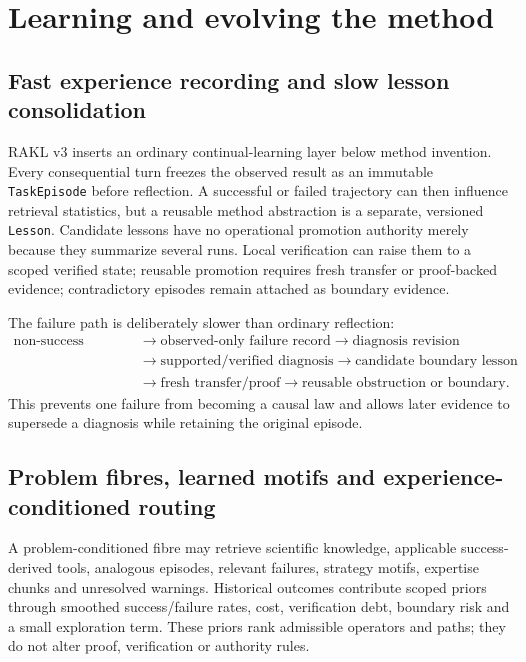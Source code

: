 \section{Learning and evolving the method}


\subsection{Fast experience recording and slow lesson consolidation}
RAKL v3 inserts an ordinary continual-learning layer below method invention. Every consequential turn freezes the observed result as an immutable \texttt{TaskEpisode} before reflection. A successful or failed trajectory can then influence retrieval statistics, but a reusable method abstraction is a separate, versioned \texttt{Lesson}. Candidate lessons have no operational promotion authority merely because they summarize several runs. Local verification can raise them to a scoped verified state; reusable promotion requires fresh transfer or proof-backed evidence; contradictory episodes remain attached as boundary evidence.

The failure path is deliberately slower than ordinary reflection:
\begin{equation}
\begin{aligned}
\text{non-success episode}
&\to \text{observed-only failure record}
\to \text{diagnosis revision}\\
&\to \text{supported/verified diagnosis}
\to \text{candidate boundary lesson}\\
&\to \text{fresh transfer/proof}
\to \text{reusable obstruction or boundary}.
\end{aligned}
\end{equation}
This prevents one failure from becoming a causal law and allows later evidence to supersede a diagnosis while retaining the original episode.

\subsection{Problem fibres, learned motifs and experience-conditioned routing}
A problem-conditioned fibre may retrieve scientific knowledge, applicable success-derived tools, analogous episodes, relevant failures, strategy motifs, expertise chunks and unresolved warnings. Historical outcomes contribute scoped priors through smoothed success/failure rates, cost, verification debt, boundary risk and a small exploration term. These priors rank admissible operators and paths; they do not alter proof, verification or authority rules.


